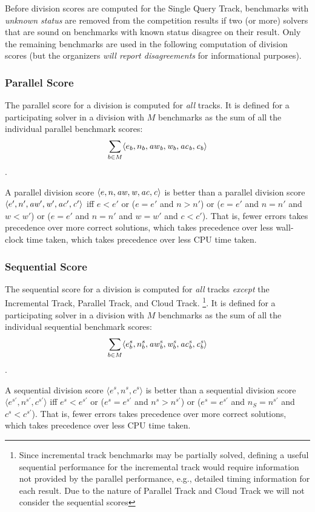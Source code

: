 \documentclass[12pt]{article}
\newcommand{\maintrack}{Single Query Track\xspace}
\newcommand{\inctrack}{Incremental Track\xspace}
\newcommand{\paralleltrack}{Parallel Track\xspace}
\newcommand{\cloudtrack}{Cloud Track\xspace}
\begin{document}
Before division scores are computed for the \maintrack{},
benchmarks with \emph{unknown status} are removed from the competition results
if two (or more) solvers that are sound on benchmarks with known status
disagree on their result.
%
Only the remaining benchmarks are used in the following computation of division
scores (but the organizers \emph{will report disagreements} for informational
purposes).

\subsubsection{Parallel Score}

The parallel score for a division is computed for \emph{all} tracks.  It is
defined for a participating solver in a division with $M$ benchmarks as the sum
of all the individual parallel benchmark scores:
$$\sum_{b\in M} \langle e_b , n_b , \it{aw}_b, w_b, \it{ac}_b, c_b\rangle$$.

\noindent
A parallel division score $\langle
e, n, \it{aw}, w, \it{ac}, c\rangle$ is better than a parallel
division score\newline $\langle e', n', \it{aw}', w', \it{ac}', c'\rangle$ iff $e < e'$ or ($e = e'$ and $n
> n'$) or ($e = e'$ and $n = n'$ and $w < w'$) or ($e = e'$ and $n = n'$ and $w
= w'$ and $c < c'$).  That is, fewer errors takes precedence over more correct
solutions, which takes precedence over less wall-clock time taken, which takes
precedence over less CPU time taken.

\subsubsection{Sequential Score}

The sequential score for a division is computed for \emph{all} tracks
\emph{except} the \inctrack, \paralleltrack, and \cloudtrack.
\footnote{Since incremental track benchmarks may be partially
solved, defining a useful sequential performance for the incremental track
would require information not provided by the parallel performance, e.g.,
detailed timing information for each result.  Due to the nature of
\paralleltrack and \cloudtrack we will not consider the sequential
scores}.  It is defined for a
participating solver in a division with $M$ benchmarks as the sum of all the
individual sequential benchmark scores:
$$\sum_{b\in M} \langle e_b^s, n_b^s, \it{aw}_b^s, w_b^s, \it{ac}_b^s, c_b^s\rangle$$.

\noindent
A sequential division score $\langle e^s, n^s, c^s\rangle$ is better than a
sequential division score $\langle e^{s'}, n^{s'}, c^{s'}\rangle$ iff
$e^s < e^{s'}$ or ($e^s = e^{s'}$ and $n^s > n^{s'}$) or ($e^s = e^{s'}$ and
$n_S = n^{s'}$ and $c^s < c^{s'}$).
That is, fewer errors takes precedence over more correct solutions,
which takes precedence over less CPU time taken.
\end{document}
